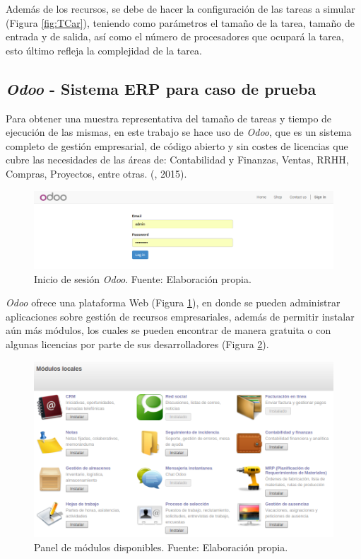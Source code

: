 Adem\'as de los recursos, se debe de hacer la configuraci\'on de las tareas a simular (Figura \ref{fig:TCar}), teniendo como par\'ametros el tamaño de la tarea, tamaño de entrada y de salida, as\'i como el número de procesadores que ocupar\'a la tarea, esto \'ultimo refleja la complejidad de la tarea.

\subsection*{\textit{Odoo} - Sistema ERP para caso de prueba}

Para obtener una muestra representativa del tamaño de tareas y tiempo de ejecución de las mismas, en este trabajo se hace uso de \textit{Odoo}, que es un sistema completo de gestión empresarial, de código abierto y sin costes de licencias que cubre las necesidades de las áreas de: Contabilidad y Finanzas, Ventas, RRHH, Compras, Proyectos, entre otras. (\citeauthor{odooWiki}, 2015).

\renewcommand\thefigure{\arabic{figure}}
\begin{figure}[h!]
	\centering
	\includegraphics[scale=0.3]{media/odoo/1}
	\caption{Inicio de sesión \textit{Odoo}. Fuente: Elaboración propia.}
	\label{fig:loginOdoo}
\end{figure}


\textit{Odoo} ofrece una plataforma Web (Figura \ref{fig:loginOdoo}), en donde se pueden administrar aplicaciones sobre gestión de recursos empresariales, además de permitir instalar aún más módulos, los cuales se pueden encontrar de manera gratuita o con algunas licencias por parte de sus desarrolladores (Figura \ref{fig:OdooApps}).

\renewcommand\thefigure{\arabic{figure}}
\begin{figure}[h!]
	\centering
	\includegraphics[scale=0.3]{media/odoo/2}
	\caption{Panel de módulos disponibles. Fuente: Elaboración propia.}
	\label{fig:OdooApps}
\end{figure}

